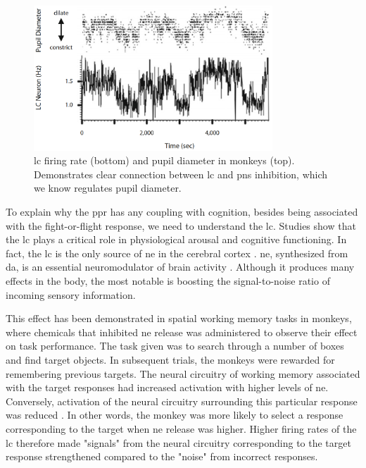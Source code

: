 \begin{figure}[h]
    \centering
    \includegraphics[width=0.8\textwidth]{figures/bt_LC_correlation.png}
    \caption{\acrlong{lc} firing rate (bottom) and pupil diameter in monkeys (top). Demonstrates clear connection between \acrshort{lc} and \acrshort{pns} inhibition, which we know regulates pupil diameter.}
    \label{fig:bt/lc_corr}
\end{figure}

To explain why the \acrshort{ppr} has any coupling with cognition, besides being associated with the fight-or-flight response, we need to understand the \acrlong{lc}. Studies show that the \acrshort{lc} plays a critical role in physiological arousal and cognitive functioning. In fact, the \acrshort{lc} is the only source of \acrfull{ne} in the cerebral cortex \cite{sara2009}. \acrshort{ne}, synthesized from \acrfull{da}, is an essential neuromodulator of brain activity \cite{aminoff2014}. Although it produces many effects in the body, the most notable is boosting the signal-to-noise ratio of incoming sensory information. 

This effect has been demonstrated in spatial working memory tasks in monkeys, where chemicals that inhibited \acrshort{ne} release was administered to observe their effect on task performance. The task given was to search through a number of boxes and find target objects. In subsequent trials, the monkeys were rewarded for remembering previous targets. The neural circuitry of working memory associated with the target responses had increased activation with higher levels of \acrshort{ne}. Conversely, activation of the neural circuitry surrounding this particular response was reduced \cite{ramos2007}. In other words, the monkey was more likely to select a response corresponding to the target when \acrshort{ne} release was higher. Higher firing rates of the \acrshort{lc} therefore made "signals" from the neural circuitry corresponding to the target response strengthened compared to the "noise" from incorrect responses.

